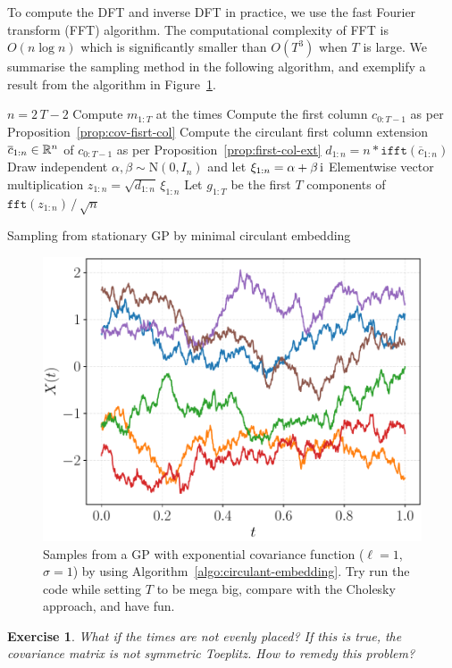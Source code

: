 \documentclass[]{article}
\newtheorem{exercise}[theorem]{Exercise}
\begin{document}
To compute the DFT and inverse DFT in practice, we use the fast Fourier transform (FFT) algorithm. The computational complexity of FFT is $O(n\log n)$ which is significantly smaller than $O(T^3)$ when $T$ is large. We summarise the sampling method in the following algorithm, and exemplify a result from the algorithm in Figure~\ref{fig:circulant-sample}.

\begin{algorithm}
	\SetAlgoLined
	$n = 2 \, T - 2$\;
	Compute $m_{1:T}$ at the times\;
	Compute the first column $c_{0:T-1}$ as per Proposition~\ref{prop:cov-fisrt-col}\;
	Compute the circulant first column extension $\overline{c}_{1:n} \in \mathbb{R}^{n}$ of $c_{0:T-1}$ as per Proposition~\ref{prop:first-col-ext}\;
	$d_{1:n} = n * \texttt{ifft}(\overline{c}_{1:n})$\;
	Draw independent $\alpha, \beta\sim\mathrm{N}(0,I_{n})$ and let $\xi_{1:n} = \alpha + \beta \, \mathrm{i}$\;
	Elementwise vector multiplication $z_{1:n}=\sqrt{d_{1:n}} \, \xi_{1:n}$\;
	Let $g_{1:T}$ be the first $T$ components of $\texttt{fft}(z_{1:n}) \, / \, \sqrt{n}$\;
	\caption{Sampling from stationary GP by minimal circulant embedding}
	\label{algo:circulant-embedding}
\end{algorithm}

\begin{figure}[t!]
	\centering
	\includegraphics[width=.6\linewidth]{figs/circulant-gp-sample}
	\caption{Samples from a GP with exponential covariance function ($\ell=1$, $\sigma=1$) by using Algorithm~\ref{algo:circulant-embedding}. Try run the code while setting $T$ to be mega big, compare with the Cholesky approach, and have fun.}
	\label{fig:circulant-sample}
\end{figure}

\begin{exercise}
	What if the times are not evenly placed? If this is true, the covariance matrix is not symmetric Toeplitz. How to remedy this problem?
\end{exercise}
\end{document}

